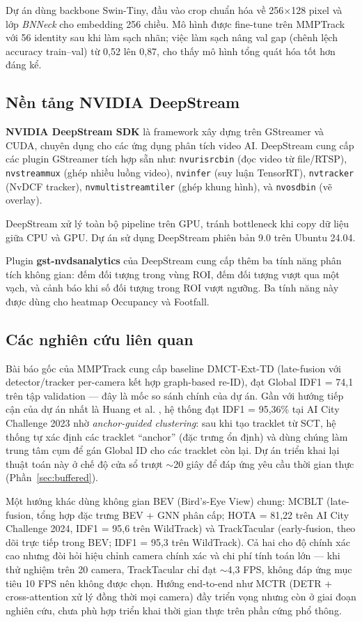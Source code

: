 \documentclass{article} %
\begin{document}
Dự án dùng backbone Swin-Tiny, đầu vào crop chuẩn hóa về 256$\times$128 pixel và lớp \textit{BNNeck} cho embedding 256 chiều. Mô hình được fine-tune trên MMPTrack với 56 identity sau khi làm sạch nhãn; việc làm sạch nâng val gap (chênh lệch accuracy train--val) từ 0{,}52 lên 0{,}87, cho thấy mô hình tổng quát hóa tốt hơn đáng kể.

\subsection{Nền tảng NVIDIA DeepStream}

\textbf{NVIDIA DeepStream SDK} là framework xây dựng trên GStreamer và CUDA, chuyên dụng cho các ứng dụng phân tích video AI. DeepStream cung cấp các plugin GStreamer tích hợp sẵn như: \texttt{nvurisrcbin} (đọc video từ file/RTSP), \texttt{nvstreammux} (ghép nhiều luồng video), \texttt{nvinfer} (suy luận TensorRT), \texttt{nvtracker} (NvDCF tracker), \texttt{nvmultistreamtiler} (ghép khung hình), và \texttt{nvosdbin} (vẽ overlay).

DeepStream xử lý toàn bộ pipeline trên GPU, tránh bottleneck khi copy dữ liệu giữa CPU và GPU. Dự án sử dụng DeepStream phiên bản 9.0 trên Ubuntu 24.04.

Plugin \textbf{gst-nvdsanalytics} của DeepStream cung cấp thêm ba tính năng phân tích không gian: đếm đối tượng trong vùng ROI, đếm đối tượng vượt qua một vạch, và cảnh báo khi số đối tượng trong ROI vượt ngưỡng. Ba tính năng này được dùng cho heatmap Occupancy và Footfall.

\subsection{Các nghiên cứu liên quan}

Bài báo gốc của MMPTrack \cite{Han2022} cung cấp baseline DMCT-Ext-TD (late-fusion với detector/tracker per-camera kết hợp graph-based re-ID), đạt Global IDF1 = 74{,}1 trên tập validation --- đây là mốc so sánh chính của dự án. Gần với hướng tiếp cận của dự án nhất là Huang et al. \cite{Huang2023}, hệ thống đạt IDF1 = 95{,}36\% tại AI City Challenge 2023 nhờ \textit{anchor-guided clustering}: sau khi tạo tracklet từ SCT, hệ thống tự xác định các tracklet ``anchor'' (đặc trưng ổn định) và dùng chúng làm trung tâm cụm để gán Global ID cho các tracklet còn lại. Dự án triển khai lại thuật toán này ở chế độ cửa sổ trượt $\sim$20 giây để đáp ứng yêu cầu thời gian thực (Phần~\ref{sec:buffered}).

Một hướng khác dùng không gian BEV (Bird's-Eye View) chung: MCBLT \cite{Wang24MCBLT} (late-fusion, tổng hợp đặc trưng BEV + GNN phân cấp; HOTA = 81{,}22 trên AI City Challenge 2024, IDF1 = 95{,}6 trên WildTrack) và TrackTacular \cite{Teepe2024} (early-fusion, theo dõi trực tiếp trong BEV; IDF1 = 95{,}3 trên WildTrack). Cả hai cho độ chính xác cao nhưng đòi hỏi hiệu chỉnh camera chính xác và chi phí tính toán lớn --- khi thử nghiệm trên 20 camera, TrackTacular chỉ đạt $\sim$4{,}3 FPS, không đáp ứng mục tiêu 10 FPS nên không được chọn. Hướng end-to-end như MCTR \cite{Niculescu2026} (DETR + cross-attention xử lý đồng thời mọi camera) đầy triển vọng nhưng còn ở giai đoạn nghiên cứu, chưa phù hợp triển khai thời gian thực trên phần cứng phổ thông.
\end{document}
